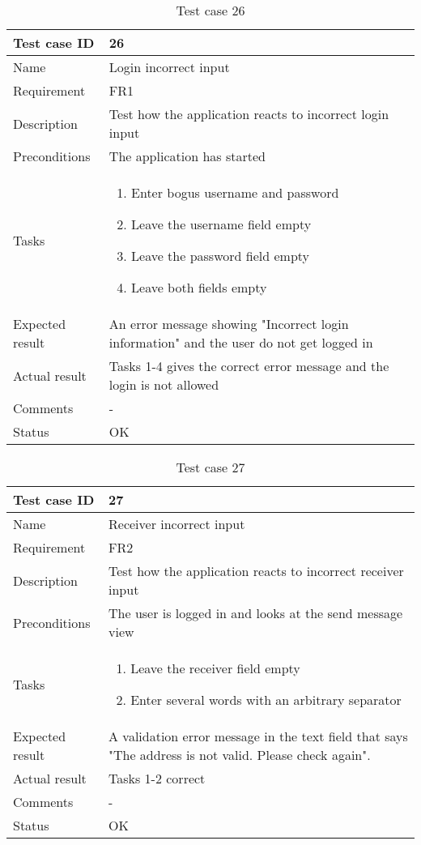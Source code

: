			\begin{table}
			\begin{tabular}{l|p{10cm}}
				Test case ID & 26\\ \hline
				Name & Login incorrect input\\ \hline
				Requirement & FR1\\ \hline
				Description&Test how the application reacts to incorrect login input\\ \hline
				Preconditions&The application has started\\ \hline
				Tasks&\begin{enumerate}
						\item{}Enter bogus username and password
						\item{}Leave the username field empty
						\item{}Leave the password field empty
						\item{}Leave both fields empty
					\end{enumerate} \\ \hline
				Expected result&An error message showing "Incorrect login information" and the user do not get logged in\\ \hline
				Actual result& Tasks 1-4 gives the correct error message and the login is not allowed\\ \hline
				Comments&- \\ \hline
				Status& OK\\ \hline 
			\end{tabular}
			\caption{Test case 26} \label{tab:case26}
			\end{table}

				\begin{table}
			\begin{tabular}{l|p{10cm}}
				Test case ID & 27\\ \hline
				Name & Receiver incorrect input\\ \hline
				Requirement & FR2\\ \hline
				Description&Test how the application reacts to incorrect receiver input\\ \hline
				Preconditions&The user is logged in and looks at the send message view\\ \hline
				Tasks&\begin{enumerate}
						\item{}Leave the receiver field empty
						\item{}Enter several words with an arbitrary separator
					\end{enumerate} \\ \hline
				Expected result&A validation error message in the text field that says "The address is not valid. Please check again". \\ \hline
				Actual result&Tasks 1-2 correct\\ \hline
				Comments&-\\ \hline
				Status& OK\\ \hline 
			\end{tabular}
			\caption{Test case 27} \label{tab:case27}
			\end{table}

